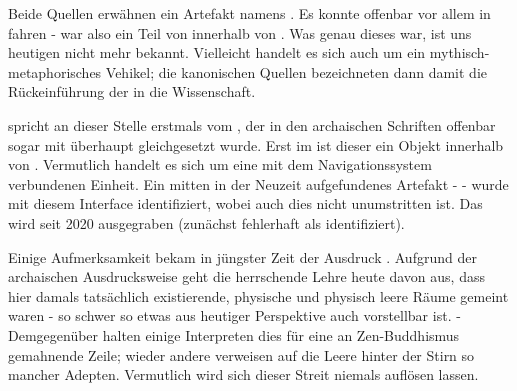 
Beide Quellen erwähnen ein Artefakt namens . Es konnte offenbar vor allem in  fahren - war also ein Teil von  innerhalb von . Was genau dieses war, ist uns heutigen nicht mehr bekannt. Vielleicht handelt es sich auch um ein mythisch-metaphorisches Vehikel; die kanonischen Quellen bezeichneten dann damit die Rückeinführung der  in die Wissenschaft. 

 spricht an dieser Stelle erstmals vom , der in den archaischen Schriften offenbar sogar mit  überhaupt gleichgesetzt wurde. Erst im  ist dieser  ein Objekt innerhalb von . Vermutlich handelt es sich um eine mit dem Navigationssystem verbundenen Einheit. Ein mitten in der Neuzeit aufgefundenes Artefakt -  - wurde mit diesem Interface identifiziert, wobei auch dies nicht unumstritten ist. Das  wird seit 2020 ausgegraben (zunächst fehlerhaft als  identifiziert).

Einige Aufmerksamkeit bekam in jüngster Zeit der Ausdruck . Aufgrund der archaischen Ausdrucksweise geht die herrschende Lehre heute davon aus, dass hier damals tatsächlich existierende, physische und physisch leere Räume gemeint waren - so schwer so etwas aus heutiger Perspektive auch vorstellbar ist. - Demgegenüber halten einige Interpreten dies für eine an Zen-Buddhismus gemahnende Zeile; wieder andere verweisen auf die Leere hinter der Stirn so mancher Adepten. Vermutlich wird sich dieser Streit niemals auflösen lassen.


